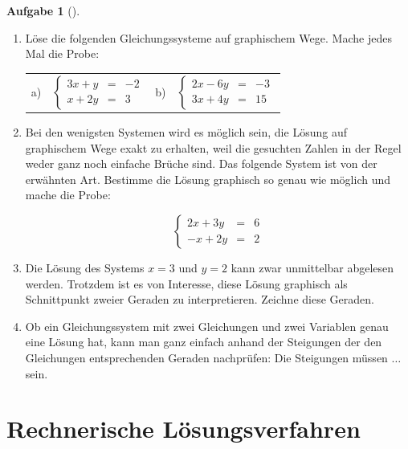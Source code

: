 \documentclass[a4paper, twoside, parskip, 10pt, smallheadings]{scrbook}
\theoremstyle{plain}
\theoremstyle{definition}
\newtheorem{Auf}{Aufgabe}%
\newenvironment{fshaded}{%
\def\FrameCommand{\fcolorbox{framecolor}{shadecolor}}%
\MakeFramed {\FrameRestore}}%
{\endMakeFramed}
\newenvironment{fauf}[1][]{\definecolor{shadecolor}{rgb}{.58,.788,1}%
\definecolor{framecolor}{rgb}{.13,.25,.9}%
\begin{fshaded}\begin{Auf}[#1]}{\end{Auf}\end{fshaded}}
\newcommand{\ba}{\begin{fauf}}
\newcommand{\ea}{\end{fauf}}
\newcommand{\bn}{\begin{enumerate}}
\newcommand{\en}{\end{enumerate}}
\newcommand{\bt}{\begin{tabular}}
\newcommand{\et}{\end{tabular}}
\begin{document}
\ba \bn \item L\"{o}se die folgenden Gleichungssysteme auf graphischem Wege. Mache jedes Mal die Probe:

\bt{llll}
 a) & $  \left\{ \begin{array}{rcl}  3x + y& = & -2 \\
                                              x+2y & = & 3
                                       \end{array} \right.       $      &  b) & $  \left\{ \begin{array}{rcl} 2x-6y & = & -3 \\
                                               3x+4y & = & 15
                                       \end{array} \right.       $ \et





\item  Bei den wenigsten Systemen wird es m\"{o}glich sein, die L\"{o}sung auf graphischem Wege exakt zu erhalten, weil
die gesuchten Zahlen in der Regel weder ganz noch einfache Br\"{u}che sind. Das folgende System ist von der
erw\"{a}hnten Art. Bestimme die L\"{o}sung graphisch so genau wie m\"{o}glich und mache die Probe:

\begin{displaymath} \left\{ \begin{array}{rcl} 2x + 3y & = & 6 \\
                                               -x + 2y & = & 2
                                       \end{array} \right. \end{displaymath}


\item  Die L\"{o}sung des Systems $x = 3$ und $y = 2$ kann zwar unmittelbar abgelesen werden. Trotzdem ist es von
Interesse, diese L\"{o}sung graphisch als Schnittpunkt zweier Geraden zu interpretieren. Zeichne diese Geraden.

\item Ob ein Gleichungssystem mit zwei Gleichungen und zwei Variablen genau eine L\"{o}sung hat, kann man ganz
einfach anhand der Steigungen der den Gleichungen entsprechenden Geraden nachpr\"{u}fen: Die Steigungen m\"{u}ssen
$\dots $sein. \en \ea

\section{Rechnerische L\"{o}sungsverfahren}
\end{document}
